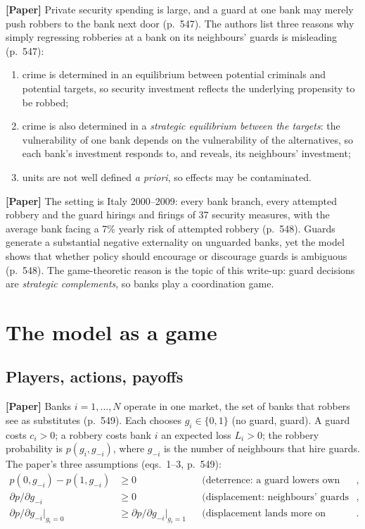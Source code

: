 \documentclass[11pt,a4paper]{article}
\newcommand{\paper}{\textbf{[Paper]}}
\begin{document}
\paper{} Private security spending is large, and a guard at one bank may merely push robbers to the
bank next door (p.\ 547). The authors list three reasons why simply regressing robberies at a
bank on its neighbours' guards is misleading (p.\ 547):
\begin{enumerate}[label=(\alph*)]
  \item crime is determined in an equilibrium between potential criminals and potential targets,
        so security investment reflects the underlying propensity to be robbed;
  \item crime is also determined in a \emph{strategic equilibrium between the targets}: the
        vulnerability of one bank depends on the vulnerability of the alternatives, so each bank's
        investment responds to, and reveals, its neighbours' investment;
  \item units are not well defined \emph{a priori}, so effects may be contaminated.
\end{enumerate}
\paper{} The setting is Italy 2000--2009: every bank branch, every attempted robbery and the
guard hirings and firings of 37 security measures, with the average bank facing a 7\% yearly risk of
attempted robbery (p.\ 548). Guards generate a substantial negative externality on unguarded banks,
yet the model shows that whether policy should encourage or discourage guards is ambiguous
(p.\ 548). The game-theoretic reason is the topic of this write-up: guard decisions are
\emph{strategic complements}, so banks play a coordination game.

\section{The model as a game}

\subsection{Players, actions, payoffs}
\paper{} Banks $i=1,\dots,N$ operate in one market, the set of banks that robbers see as substitutes
(p.\ 549). Each chooses $g_i\in\{0,1\}$ (no guard, guard). A guard costs $c_i>0$; a robbery costs bank $i$ an
expected loss $L_i>0$; the robbery probability is $p(g_i,g_{-i})$, where $g_{-i}$ is the number of
neighbours that hire guards. The paper's three assumptions (eqs.\ 1--3, p.\ 549):
\begin{align}
  p(0,g_{-i})-p(1,g_{-i}) &\ge 0 &&\text{(deterrence: a guard lowers own risk)},\label{e1}\\
  \partial p/\partial g_{-i} &\ge 0 &&\text{(displacement: neighbours' guards raise own risk)},\label{e2}\\
  \partial p/\partial g_{-i}\big|_{g_i=0} &\ge \partial p/\partial g_{-i}\big|_{g_i=1}
    &&\text{(displacement lands more on unguarded banks)}.\label{e3}
\end{align}
\end{document}
